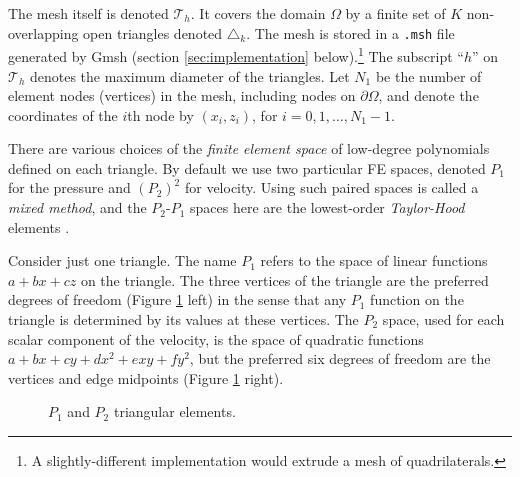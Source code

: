 \documentclass[letterpaper,final,12pt,reqno]{amsart}
\begin{document}
The mesh itself is denoted $\mathcal{T}_h$.  It covers the domain $\Omega$ by a finite set of $K$ non-overlapping open triangles denoted $\triangle_k$.  The mesh is stored in a \texttt{.msh} file generated by Gmsh (section \ref{sec:implementation} below).\footnote{A slightly-different implementation would extrude a mesh of quadrilaterals.}  The subscript ``$h$'' on $\mathcal{T}_h$ denotes the maximum diameter of the triangles.  Let $N_1$ be the number of element nodes (vertices) in the mesh, including nodes on $\partial\Omega$, and denote the coordinates of the $i$th node by $(x_i,z_i)$, for $i=0,1,\dots,N_1-1$.

There are various choices of the \emph{finite element space} of low-degree polynomials defined on each triangle.  By default we use two particular FE spaces, denoted $P_1$ for the pressure and $(P_2)^2$ for velocity.  Using such paired spaces is called a \emph{mixed method}, and the $P_2$-$P_1$ spaces here are the lowest-order \emph{Taylor-Hood} elements \cite{Elmanetal2014}.

Consider just one triangle.  The name $P_1$ refers to the space of linear functions $a + b x + c z$ on the triangle.  The three vertices of the triangle are the preferred degrees of freedom (Figure \ref{fig:fedofs} left) in the sense that any $P_1$ function on the triangle is determined by its values at these vertices.  The $P_2$ space, used for each scalar component of the velocity, is the space of quadratic functions $a + bx + cy + dx^2 + exy + fy^2$, but the preferred six degrees of freedom are the vertices and edge midpoints (Figure \ref{fig:fedofs} right).

\begin{figure}[ht]
\caption{$P_1$ and $P_2$ triangular elements.}
\label{fig:fedofs}
\end{figure}
\end{document}
